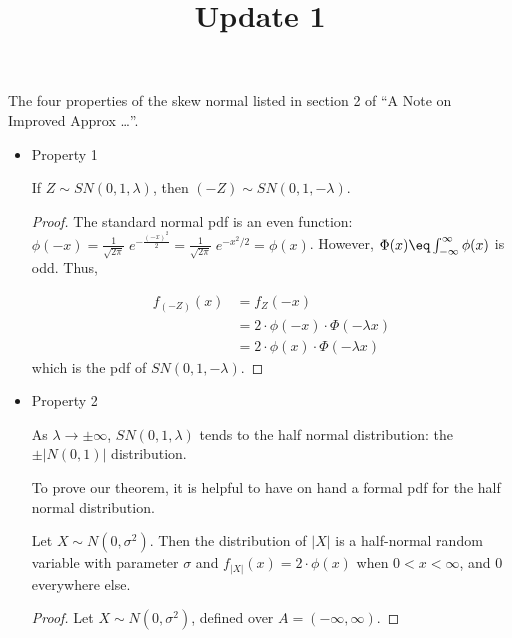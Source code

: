 \message{ !name(properties.tex)}\documentclass{article}
\begin{document}

\title{Update 1}
\date{}
\maketitle

The four properties of the skew normal listed in section 2 of ``A Note on Improved Approx \ldots''.

\begin{itemize}
\item Property 1
  \begin{thm*}
    If $Z \sim SN(0, 1, \lambda)$, then $(-Z) \sim SN(0, 1, -\lambda)$.
  \end{thm*}
  
  \begin{proof}

    The standard normal pdf is an even function: $\phi(-x) =
    \frac{1}{\sqrt{2\pi}}\;e^{-\frac{(-x)^2}{2}} = \frac{1}{\sqrt{2\pi}}\;e^{-x^2/2} =
    \phi(x)$. However, $\Phi(x) \eq \int_{-\infty}^\infty \phi(x)$ is odd. Thus,

    \begin{align*}
      f_{(-Z)}(x) &= f_Z(-x) \\
      & = 2 \cdot \phi(-x) \cdot \Phi (-\lambda x) \\
      & = 2 \cdot \phi(x) \cdot \Phi (-\lambda x)
    \end{align*}
    which is the pdf of $SN(0, 1, -\lambda)$.
  \end{proof}

\item Property 2
  \begin{thm*}
    As $\lambda \to \pm \infty$, $SN(0, 1, \lambda)$ tends to the half normal distribution: the $\pm
    |N(0,1)|$ distribution.
  \end{thm*}

  To prove our theorem, it is helpful to have on hand a formal pdf for the half normal distribution.

  \begin{lemma*}
    Let $X \sim N(0, \sigma^2)$. Then the distribution of $|X|$ is a half-normal random variable
    with parameter $\sigma$ and $f_{|X|}(x) = 2 \cdot \phi(x)$ when $0 < x < \infty$, and 0
    everywhere else.
  \end{lemma*}

  \begin{proof}
    Let $X \sim N(0, \sigma^2)$, defined over $A = (-\infty, \infty)$.


\end{proof}
\end{itemize}
\end{document}
